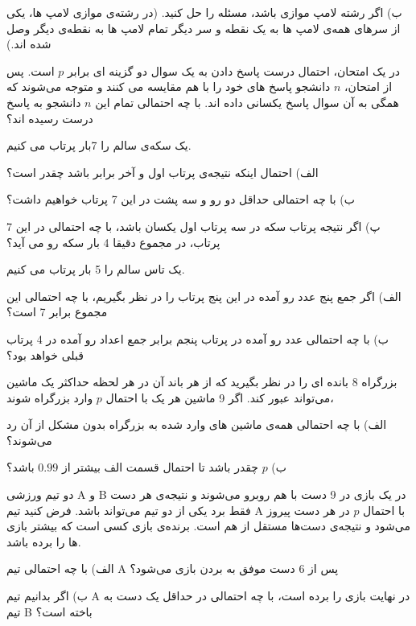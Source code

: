 ب) اگر رشته لامپ موازی باشد، مسئله را حل کنید. (در رشته‌ی موازی لامپ ها، یکی از سرهای همه‌ی لامپ ها به یک نقطه و سر دیگر تمام لامپ ها به نقطه‌ی دیگر وصل شده اند.)


\Q
در یک امتحان، احتمال درست پاسخ دادن به یک سوال دو گزینه ای برابر $p$ است. پس از امتحان، $n$ دانشجو پاسخ های خود را با هم مقایسه می کنند و متوجه می‌شوند که همگی به آن سوال پاسخ یکسانی داده اند. با چه احتمالی تمام این $n$ دانشجو به پاسخ درست رسیده اند؟


\Q
یک سکه‌ی سالم را 7بار پرتاب می کنیم.

الف) احتمال اینکه نتیجه‌ی پرتاب اول و آخر برابر باشد چقدر است؟

ب) با چه احتمالی حداقل دو رو و سه پشت در این 7 پرتاب خواهیم داشت؟

پ) اگر نتیجه پرتاب سکه در سه پرتاب اول یکسان باشد، با چه احتمالی در این 7 پرتاب، در مجموع دقیقا 4 بار سکه رو می آید؟


\Q
یک تاس سالم را 5 بار پرتاب می کنیم.

الف) اگر جمع پنج عدد رو آمده در این پنج پرتاب را در نظر بگیریم، با چه احتمالی این مجموع برابر 7 است؟

ب) با چه احتمالی عدد رو آمده در پرتاب پنجم برابر جمع اعداد رو آمده در 4 پرتاب قبلی خواهد بود؟


\Q
بزرگراه 8 بانده ای را در نظر بگیرید که از هر باند آن در هر لحظه حداکثر یک ماشین می‌تواند عبور کند. اگر 9 ماشین هر یک با احتمال $p$ وارد بزرگراه شوند،

الف) با چه احتمالی همه‌ی ماشین های وارد شده به بزرگراه بدون مشکل از آن رد می‌شوند؟

ب) $p$ چقدر باشد تا احتمال قسمت الف بیشتر از $0.99$ باشد؟


\Q
دو تیم ورزشی A و B در یک بازی در 9 دست با هم روبرو می‌شوند و نتیجه‌ی هر دست فقط برد یکی از دو تیم می‌تواند باشد. فرض کنید تیم A با احتمال $p$ در هر دست پیروز می‌شود و نتیجه‌ی دست‌ها مستقل از هم است. برنده‌ی بازی کسی است که بیشتر بازی ها را برده باشد.

الف) با چه احتمالی تیم A پس از 6 دست موفق به بردن بازی می‌شود؟

ب) اگر بدانیم تیم A در نهایت بازی را برده است، با چه احتمالی در حداقل یک دست به تیم B باخته است؟

